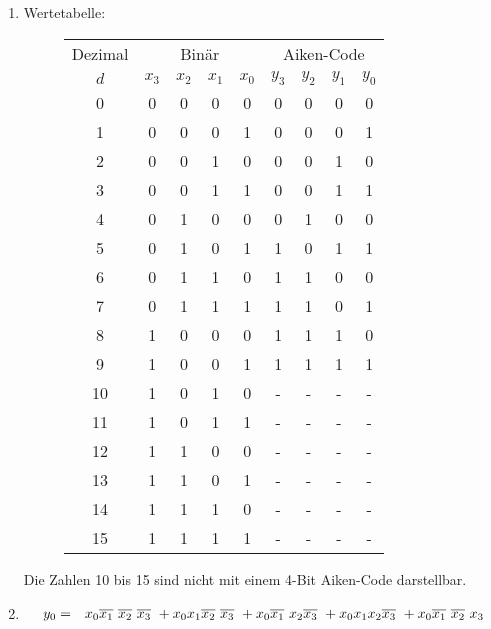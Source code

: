 \documentclass[DIN, pagenumber=false, fontsize=11pt, parskip=half]{scrartcl}
\newcommand{\minTerm}[4]{
    \IfEqCase{#1}{
        {0}{\overline{x_0}\ }
        {1}{x_0}
    }
    \IfEqCase{#2}{
        {0}{\overline{x_1}\ }
        {1}{x_1}
    }
    \IfEqCase{#3}{
        {0}{\overline{x_2}\ }
        {1}{x_2}
    }
    \IfEqCase{#4}{
        {0}{\overline{x_3}\ }
        {1}{x_3}
    }[\PackageError{minTerm}{Values must either be 0 or 1}]
}
\begin{document}
    \subsection{}
    \begin{enumerate}[label=(\alph*)]
        \item Wertetabelle:
            \begin{figure}[H]
                \centering
                \begin{tabular}{c|cccc|cccc}
                    \toprule
                    Dezimal & \multicolumn{4}{c|}{Binär} & \multicolumn{4}{c}{Aiken-Code} \\
                    $d$ & $x_3$ & $x_2$ & $x_1$ & $x_0$ & $y_3$ & $y_2$ & $y_1$ & $y_0$ \\
                    \midrule
					0 & 0 & 0 & 0 & 0 & 0 & 0 & 0 & 0 \\
					1 & 0 & 0 & 0 & 1 & 0 & 0 & 0 & 1 \\
					2 & 0 & 0 & 1 & 0 & 0 & 0 & 1 & 0 \\
					3 & 0 & 0 & 1 & 1 & 0 & 0 & 1 & 1 \\
					4 & 0 & 1 & 0 & 0 & 0 & 1 & 0 & 0 \\
					5 & 0 & 1 & 0 & 1 & 1 & 0 & 1 & 1 \\
					6 & 0 & 1 & 1 & 0 & 1 & 1 & 0 & 0 \\
					7 & 0 & 1 & 1 & 1 & 1 & 1 & 0 & 1 \\
					8 & 1 & 0 & 0 & 0 & 1 & 1 & 1 & 0 \\
					9 & 1 & 0 & 0 & 1 & 1 & 1 & 1 & 1 \\
					10 & 1 & 0 & 1 & 0 & - & - & - & - \\
					11 & 1 & 0 & 1 & 1 & - & - & - & - \\
					12 & 1 & 1 & 0 & 0 & - & - & - & - \\
					13 & 1 & 1 & 0 & 1 & - & - & - & - \\
					14 & 1 & 1 & 1 & 0 & - & - & - & - \\
					15 & 1 & 1 & 1 & 1 & - & - & - & - \\
                    \bottomrule
                \end{tabular}
            \end{figure}
		Die Zahlen 10 bis 15 sind nicht mit einem 4-Bit Aiken-Code darstellbar.
		\item 
		\begin{eqnarray*}
			y_0 &=& \minTerm{1}{0}{0}{0} + \minTerm{1}{1}{0}{0} + \minTerm{1}{0}{1}{0} + \minTerm{1}{1}{1}{0} + \minTerm{1}{0}{0}{1} \\

\end{eqnarray*}
\end{enumerate}
\end{document}
